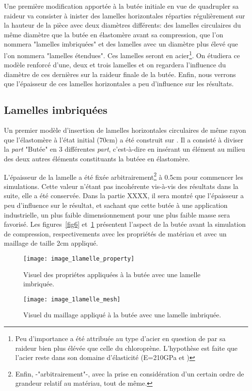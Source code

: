 ﻿\documentclass{article}
\newcommand{\abaqus}{\bsc{Abaqus}\xspace}
\begin{document}
Une première modification apportée à la butée initiale en vue de quadrupler sa raideur va consister à inister des lamelles horizontales réparties régulièrement sur la hauteur de la pièce avec deux diamètres différents: des lamelles circulaires du même diamètre que la butée en élastomère avant sa compression, que l'on nommera "lamelles imbriquées" et des lamelles avec un diamètre plus élevé que l'on nommera "lamelles étendues". Ces lamelles seront en acier\footnote{Peu d'importance a été attribuée au type d'acier en question de par sa raideur bien plus élévée que celle du chloroprène. L'hypothèse est faite que l'acier reste dans son domaine d'élasticité (E=210GPa et )}. On étudiera ce modèle renforcé d'une, deux et trois lamelles et on regardera l'influence du diamètre de ces dernières sur la raideur finale de la butée. Enfin, nous verrons que l'épaisseur de ces lamelles horizontales a peu d'influence sur les résultats.

\subsection{Lamelles imbriquées}

Un premier modèle d'insertion de lamelles horizontales circulaires de même rayon que l'élastomère à l'état initial (70cm) a été construit sur \abaqus. Il a consisté à diviser la \textit{part} "Butée" en 3 différentes \textit{part}, c'est-à-dire en insérant un élément au milieu des deux autres éléments constituants la butéee en élastomère.

L'épaisseur de la lamelle a été fixée arbitrairement\footnote{Enfin, -"arbitrairement"-, avec la prise en considération d'un certain ordre de grandeur relatif au matériau, tout de même.} à 0.5cm pour commencer les simulations. Cette valeur n'étant pas incohérente vis-à-vis des résultats dans la suite, elle a été conservée. Dans la partie XXXX, il sera montré que l'épaisseur a peu d'influence sur le résultat, et sachant que cette butée à une application industrielle, un plus faible dimensionnement pour une plus faible masse sera favorisé. 
Les figures~\ref{fig6} et~\ref{fig7} présentent l'aspect de la butée avant la simulation de compression, respectivements avec les propriétés de matériau et avec un maillage de taille 2cm appliqué.

\begin{figure}[htbp]
	\begin{minipage}[c]{.45\linewidth}
	\begin{center}
	\texttt{[image: image\_1lamelle\_property]}
	\caption{Visuel des propriétes appliquées à la butée avec une lamelle imbriquée.}
	\label{fig6}
	\end{center}
	\end{minipage}
	\hfill
	\begin{minipage}[c]{.45\linewidth}
	\begin{center}
	\texttt{[image: image\_1lamelle\_mesh]}
	\caption{Visuel du maillage appliqué à la butée avec une lamelle imbriquée.}
	\label{fig7}
	\end{center}
	\end{minipage}
\end{figure}
\end{document}
